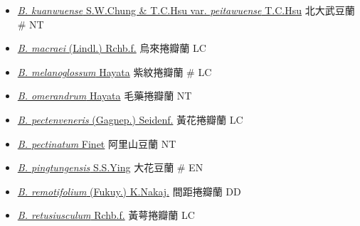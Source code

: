 \begin{itemize}
\begin{itemize}
        \item[] \href{http://www.theplantlist.org/tpl1.1/search?q=Bulbophyllum+kuanwuense+var.+peitawuense}{\textit{B. kuanwuense} S.W.Chung \& T.C.Hsu var. \textit{peitawuense} T.C.Hsu}   北大武豆蘭  \# NT
        \item[] \href{http://www.theplantlist.org/tpl1.1/search?q=Bulbophyllum+macraei}{\textit{B. macraei} (Lindl.) Rchb.f.}   烏來捲瓣蘭   LC
        \item[] \href{http://www.theplantlist.org/tpl1.1/search?q=Bulbophyllum+melanoglossum}{\textit{B. melanoglossum} Hayata}   紫紋捲瓣蘭  \# LC
        \item[] \href{http://www.theplantlist.org/tpl1.1/search?q=Bulbophyllum+omerandrum}{\textit{B. omerandrum} Hayata}   毛藥捲瓣蘭   NT
        \item[] \href{http://www.theplantlist.org/tpl1.1/search?q=Bulbophyllum+pectenveneris}{\textit{B. pectenveneris} (Gagnep.) Seidenf.}   黃花捲瓣蘭   LC
        \item[] \href{http://www.theplantlist.org/tpl1.1/search?q=Bulbophyllum+pectinatum}{\textit{B. pectinatum} Finet}   阿里山豆蘭   NT
        \item[] \href{http://www.theplantlist.org/tpl1.1/search?q=Bulbophyllum+pingtungensis}{\textit{B. pingtungensis} S.S.Ying}   大花豆蘭  \# EN
        \item[] \href{http://www.theplantlist.org/tpl1.1/search?q=Bulbophyllum+remotifolium}{\textit{B. remotifolium} (Fukuy.) K.Nakaj.}   間距捲瓣蘭   DD
        \item[] \href{http://www.theplantlist.org/tpl1.1/search?q=Bulbophyllum+retusiusculum}{\textit{B. retusiusculum} Rchb.f.}   黃萼捲瓣蘭   LC

\end{itemize}
\end{itemize}
